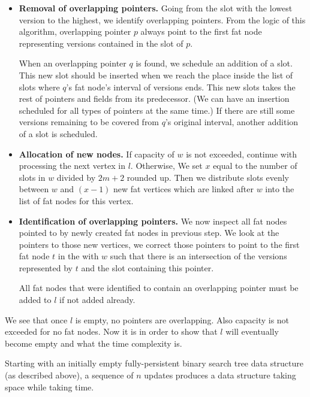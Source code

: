 \begin{itemize}
\item {\bf Removal of overlapping pointers.} Going from the slot with the lowest version to the highest, we identify overlapping pointers. From the logic of this algorithm, overlapping pointer $p$ always point to the first fat node representing versions contained in the slot of $p$. 

When an overlapping pointer $q$ is found, we schedule an addition of a slot. This new slot should be inserted when we reach the place inside the list of slots where $q$'s fat node's interval of versions ends. This new slots takes the rest of pointers and fields from its predecessor. (We can have an insertion scheduled for all types of pointers at the same time.) If there are still some versions remaining to be covered from $q$'s original interval, another addition of a slot is scheduled.

\item {\bf Allocation of new nodes.} If capacity of $w$ is not exceeded, continue with processing the next vertex in $l$. Otherwise, We set $x$ equal to the number of slots in $w$ divided by $2m+2$ rounded up. Then we distribute slots evenly between $w$ and $(x-1)$ new fat vertices which are linked after $w$ into the list of fat nodes for this vertex.

\item {\bf Identification of overlapping pointers.} We now inspect all fat nodes pointed to by newly created fat nodes in previous step. We look at the pointers to those new vertices, we correct those pointers to point to the first fat node $t$ in the with $w$ such that there is an intersection of the versions represented by $t$ and the slot containing this pointer.

All fat nodes that were identified to contain an overlapping pointer must be added to $l$ if not added already.
\end{itemize}



We see that once $l$ is empty, no pointers are overlapping. Also capacity is not exceeded for no fat nodes. Now it is in order to show that $l$ will eventually become empty and what the time complexity is.

\begin{prop}
Starting with an initially empty fully-persistent binary search tree data structure (as described above), a sequence of $n$ updates produces a data structure taking  space while taking  time.
\end{prop}

